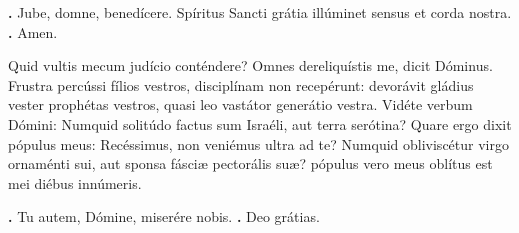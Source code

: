 \begin{small}
\textbf{\Vbar.} Jube, domne, benedícere.
Spíritus Sancti grátia illúminet sensus et corda nostra. \textbf{\Rbar.} Amen.
\end{small}


Quid vultis mecum judício conténdere? Omnes dereliquístis me, dicit Dóminus. 
Frustra percússi fílios vestros, disciplínam non recepérunt: devorávit gládius vester prophétas vestros, quasi leo vastátor 
generátio vestra. Vidéte verbum Dómini: Numquid solitúdo factus sum Israéli, aut terra serótina? Quare ergo dixit pópulus meus: Recéssimus, non veniémus ultra ad te?
Numquid obliviscétur virgo ornaménti sui, aut sponsa fásciæ pectorális suæ? pópulus vero meus oblítus est mei diébus innúmeris.

\textbf{\Vbar.} Tu autem, Dómine, miserére nobis.
\textbf{\Rbar.} Deo grátias.


